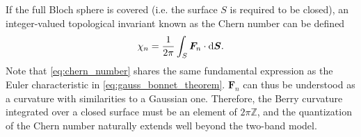 If the full Bloch sphere is covered (i.e. the surface $S$ is required to be closed), an integer-valued topological invariant known as the Chern number can be defined~\cite{Nakahara1990}
\begin{align}
    \chi_n = \frac1{2\pi}\int_S {\bm F_n}\cdot\mathrm d{\bm S}.
    \label{eq:chern_number}
\end{align}
Note that \cref{eq:chern_number} shares the same fundamental expression as the Euler characteristic in \cref{eq:gauss_bonnet_theorem}.
$\bm F_n$ can thus be understood as a curvature with similarities to a Gaussian one.
Therefore, the Berry curvature integrated over a closed surface must be an element of $2\pi \mathds Z$, and the quantization of the Chern number naturally extends well beyond the two-band model.

%
%
